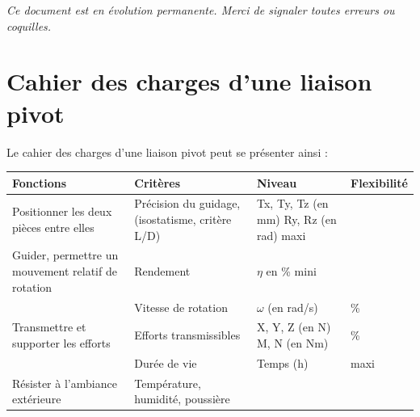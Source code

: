 \documentclass[11pt,oneside]{article}
\begin{document}
\tableofcontents

 \renewcommand{\baselinestretch}{1.2}
\setlength{\parskip}{2ex plus 0.5ex minus 0.2ex}

\textit{Ce document est en évolution permanente. Merci de signaler toutes
erreurs ou coquilles.}


\section{Cahier des charges d'une liaison pivot}

Le cahier des charges d'une liaison pivot peut se présenter ainsi :


%
%
%
%



\begin{center}
\begin{tabular}{|p{}|p{}|p{}|p{}|}
\hline
\textbf{Fonctions} & \textbf{Critères} & \textbf{Niveau} & \textbf{Flexibilité} \\
\hline
Positionner les deux pièces entre elles & Précision du guidage, (isostatisme, critère L/D)	& Tx, Ty, Tz (en mm)
Ry, Rz (en rad)	maxi  &\\
\hline
Guider, permettre un mouvement relatif de rotation & 
Rendement & $\eta$  en \% mini &\\
\cline{2-4}
& Vitesse de rotation & $\omega$  (en rad/s) & \% \\
\hline
Transmettre et supporter les efforts & Efforts transmissibles	& X, Y, Z (en N) M, N (en Nm) & \% \\
& Durée de vie & Temps (h) & maxi \\
\cline{2-4}
Résister à l'ambiance extérieure	& Température, humidité, poussière & & \\
\hline
\end{tabular}
\end{center}
\end{document}
